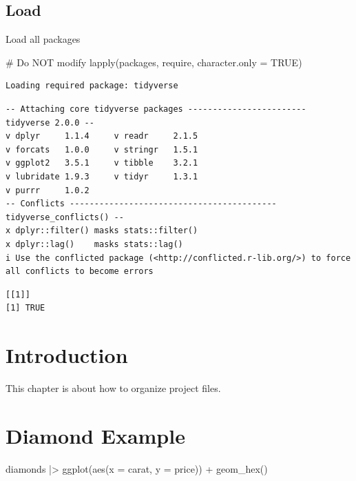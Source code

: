 \documentclass[
  letterpaper,
  DIV=11,
  numbers=noendperiod]{scrreprt}
\newenvironment{Shaded}{\begin{snugshade}}{\end{snugshade}}
\newcommand{\AttributeTok}[1]{\textcolor[rgb]{0.40,0.45,0.13}{#1}}
\newcommand{\CommentTok}[1]{\textcolor[rgb]{0.37,0.37,0.37}{#1}}
\newcommand{\ConstantTok}[1]{\textcolor[rgb]{0.56,0.35,0.01}{#1}}
\newcommand{\FunctionTok}[1]{\textcolor[rgb]{0.28,0.35,0.67}{#1}}
\newcommand{\NormalTok}[1]{\textcolor[rgb]{0.00,0.23,0.31}{#1}}
\newcommand{\SpecialCharTok}[1]{\textcolor[rgb]{0.37,0.37,0.37}{#1}}
\begin{document}
\subsection*{Load}\label{load-7}

Load all packages

\begin{Shaded}
\begin{Highlighting}[]
\CommentTok{\# Do NOT modify}
\FunctionTok{lapply}\NormalTok{(packages, require, }\AttributeTok{character.only =} \ConstantTok{TRUE}\NormalTok{)}
\end{Highlighting}
\end{Shaded}

\begin{verbatim}
Loading required package: tidyverse
\end{verbatim}

\begin{verbatim}
-- Attaching core tidyverse packages ------------------------ tidyverse 2.0.0 --
v dplyr     1.1.4     v readr     2.1.5
v forcats   1.0.0     v stringr   1.5.1
v ggplot2   3.5.1     v tibble    3.2.1
v lubridate 1.9.3     v tidyr     1.3.1
v purrr     1.0.2     
-- Conflicts ------------------------------------------ tidyverse_conflicts() --
x dplyr::filter() masks stats::filter()
x dplyr::lag()    masks stats::lag()
i Use the conflicted package (<http://conflicted.r-lib.org/>) to force all conflicts to become errors
\end{verbatim}

\begin{verbatim}
[[1]]
[1] TRUE
\end{verbatim}

\section{Introduction}\label{introduction-5}

This chapter is about how to organize project files.

\section{Diamond Example}\label{diamond-example}

\begin{Shaded}
\begin{Highlighting}[]
\NormalTok{diamonds }\SpecialCharTok{|\textgreater{}} 
  \FunctionTok{ggplot}\NormalTok{(}\FunctionTok{aes}\NormalTok{(}\AttributeTok{x =}\NormalTok{ carat, }\AttributeTok{y =}\NormalTok{ price)) }\SpecialCharTok{+}
  \FunctionTok{geom\_hex}\NormalTok{()}
\end{Highlighting}
\end{Shaded}
\end{document}
